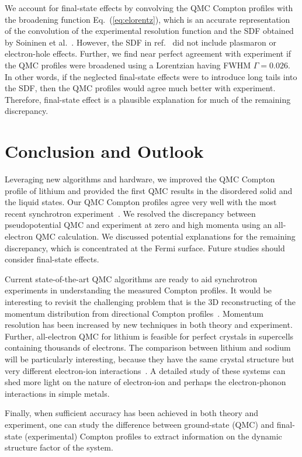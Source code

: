 We account for final-state effects by convolving the QMC Compton profiles with the broadening function Eq.~(\ref{eq:elorentz}), which is an accurate representation of the convolution of the experimental resolution function and the SDF obtained by Soininen et al.~\cite{Soininen2001}. However, the SDF in ref.~\cite{Soininen2001} did not include plasmaron or electron-hole effects. Further, we find near perfect agreement with experiment if the QMC profiles were broadened using a Lorentzian having FWHM $\Gamma=0.026$. In other words, if the neglected final-state effects were to introduce long tails into the SDF, then the QMC profiles would agree much better with experiment. Therefore, final-state effect is a plausible explanation for much of the remaining discrepancy.

\section{Conclusion and Outlook}

Leveraging new algorithms and hardware, we improved the QMC Compton profile of lithium and provided the first QMC results in the disordered solid and the liquid states. Our QMC Compton profiles agree very well with the most recent synchrotron experiment~\cite{Nozomu2019}. We resolved the discrepancy between pseudopotential QMC and experiment at zero and high momenta using an all-electron QMC calculation. We discussed potential explanations for the remaining discrepancy, which is concentrated at the Fermi surface. Future studies should consider final-state effects.

Current state-of-the-art QMC algorithms are ready to aid synchrotron experiments in understanding the measured Compton profiles. It would be interesting to revisit the challenging problem that is the 3D reconstructing of the momentum distribution from directional Compton profiles~\cite{Schulke1996,Tanaka2001}. Momentum resolution has been increased by new techniques in both theory and experiment. Further, all-electron QMC for lithium is feasible for perfect crystals in supercells containing thousands of electrons. The comparison between lithium and sodium will be particularly interesting, because they have the same crystal structure but very different electron-ion interactions~\cite{Eisenberger1972}. A detailed study of these systems can shed more light on the nature of electron-ion and perhaps the electron-phonon interactions in simple metals.

Finally, when sufficient accuracy has been achieved in both theory and experiment, one can study the difference between ground-state (QMC) and final-state (experimental) Compton profiles to extract information on the dynamic structure factor of the system.

%
